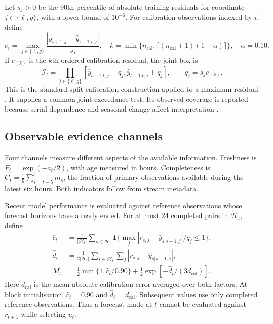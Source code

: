 \documentclass[11pt,a4paper]{article}
\newcommand{\ind}{\mathbf{1}}
\begin{document}
Let $s_j>0$ be the 90th percentile of absolute training residuals for coordinate $j\in\{\ell,g\}$, with a lower bound of $10^{-6}$. For calibration observations indexed by $i$, define
\begin{equation}
e_i=\max_{j\in\{\ell,g\}}\frac{|y_{i+1,j}-\widehat y_{i+1|i,j}|}{s_j},\quad
k=\min\{n_{\mathrm{cal}},\lceil(n_{\mathrm{cal}}+1)(1-\alpha)\rceil\},\quad \alpha=0.10.
\label{eq:calibration}
\end{equation}
If $e_{(k)}$ is the $k$th ordered calibration residual, the joint box is
\begin{equation}
\mathcal I_t=\prod_{j\in\{\ell,g\}}
[\widehat y_{t+1|t,j}-q_j,\widehat y_{t+1|t,j}+q_j],\qquad q_j=s_je_{(k)}.
\label{eq:interval}
\end{equation}
This is the standard split-calibration construction applied to a maximum residual \cite{angelopoulos}. It supplies a common joint exceedance test. Its observed coverage is reported because serial dependence and seasonal change affect interpretation \cite{oliveira}.

\subsection{Observable evidence channels}
Four channels measure different aspects of the available information. Freshness is $F_t=\exp(-a_t/2)$, with age measured in hours. Completeness is $C_t=\frac{1}{6}\sum_{s=t-5}^{t}m_s$, the fraction of primary observations available during the latest six hours. Both indicators follow from stream metadata.

Recent model performance is evaluated against reference observations whose forecast horizons have already ended. For at most 24 completed pairs in $\mathcal H_t$, define
\begin{align}
\widehat c_t&=\frac{1}{|\mathcal H_t|}\sum_{s\in\mathcal H_t}
\ind\{\max_j|r_{s,j}-\widehat y_{s|s-1,j}|/q_j\leq1\},\label{eq:recentcoverage}\\
\widehat d_t&=\frac{1}{2|\mathcal H_t|}\sum_{s\in\mathcal H_t}\sum_j
|r_{s,j}-\widehat y_{s|s-1,j}|,\label{eq:recentmae}\\
M_t&=\frac{1}{2}\min\{1,\widehat c_t/0.90\}
+\frac{1}{2}\exp[-\widehat d_t/(3d_{\mathrm{cal}})].\label{eq:maturity}
\end{align}
Here $d_{\mathrm{cal}}$ is the mean absolute calibration error averaged over both factors. At block initialisation, $\widehat c_t=0.90$ and $\widehat d_t=d_{\mathrm{cal}}$. Subsequent values use only completed reference observations. Thus a forecast made at $t$ cannot be evaluated against $r_{t+1}$ while selecting $u_t$.
\end{document}
